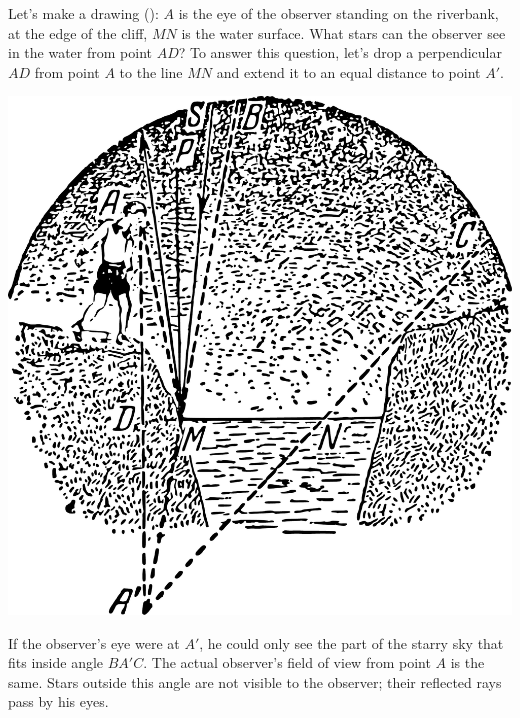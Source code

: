 Let's make a drawing (): $A$ is the eye of the observer standing on the riverbank, at the edge of the cliff, $MN$ is the water surface. What stars can the observer see in the water from point $AD$? To answer this question, let's drop a perpendicular $AD$ from point $A$ to the line $MN$ and extend it to an equal distance to point $A'$. \begin{marginfigure}[-2cm]%
\centering
\includegraphics[width=1.\textwidth]{figures/ch-02/fig-054.pdf}
\end{marginfigure}If the observer's eye were at $A'$, he could only see the part of the starry sky that fits inside angle $BA'C$. The actual observer's field of view from point $A$ is the same. Stars outside this angle are not visible to the observer; their reflected rays pass by his eyes.

